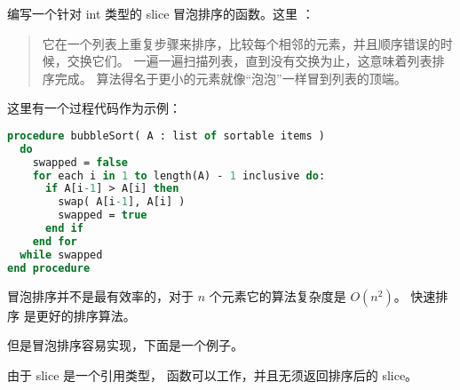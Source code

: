 \begin{Exercise}[title={冒泡排序},difficulty=5]
\label{ex:bubble}
\Question\label{ex:bubble q1} 编写一个针对 int 类型的 slice 冒泡排序的函数。这里 \cite{bubblesort}：
\begin{quote}
它在一个列表上重复步骤来排序，比较每个相邻的元素，并且顺序错误的时候，交换它们。
一遍一遍扫描列表，直到没有交换为止，这意味着列表排序完成。
算法得名于更小的元素就像“泡泡”一样冒到列表的顶端。
\end{quote}

\cite{bubblesort} 这里有一个过程代码作为示例：
\begin{lstlisting}[language=pascal]
procedure bubbleSort( A : list of sortable items )
  do
    swapped = false
    for each i in 1 to length(A) - 1 inclusive do:
      if A[i-1] > A[i] then
        swap( A[i-1], A[i] )
        swapped = true
      end if
    end for
  while swapped
end procedure
\end{lstlisting}
\end{Exercise}

\begin{Answer}
\Question 
冒泡排序并不是最有效率的，对于 $n$ 个元素它的算法复杂度是 $O(n^2)$。
快速排序 \cite{quicksort} 是更好的排序算法。

但是冒泡排序容易实现，下面是一个例子。


由于 slice 是一个引用类型， 函数可以工作，并且无须返回排序后的 slice。
\end{Answer}
